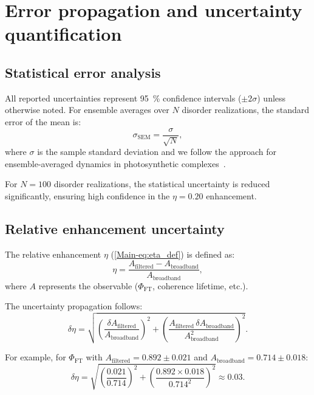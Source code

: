\documentclass[11pt,a4paper]{article}
\begin{document}
\section{Error propagation and uncertainty quantification}
\label{sec:S10}

\subsection{Statistical error analysis}

All reported uncertainties represent \SI{95}{\percent} confidence intervals ($\pm 2\sigma$) unless otherwise noted. For ensemble averages over $N$ disorder realizations, the standard error of the mean is:
\begin{equation}
\sigma_{\mathrm{SEM}} = \frac{\sigma}{\sqrt{N}},
\label{eq:SEM}
\end{equation}
where $\sigma$ is the sample standard deviation and we follow the approach for ensemble-averaged dynamics in photosynthetic complexes~\cite{Moix2011}.

For $N = 100$ disorder realizations, the statistical uncertainty is reduced significantly, ensuring high confidence in the $\eta = 0.20$ enhancement.

\subsection{Relative enhancement uncertainty}

The relative enhancement $\eta$ (\cref{Main-eq:eta_def}) is defined as:
\begin{equation}
\eta = \frac{A_{\mathrm{filtered}} - A_{\mathrm{broadband}}}{A_{\mathrm{broadband}}},
\label{eq:SI_eta_def}
\end{equation}
where $A$ represents the observable ($\Phi_{\mathrm{FT}}$, coherence lifetime, etc.).

The uncertainty propagation follows:
\begin{equation}
\delta\eta = \sqrt{\left(\frac{\delta A_{\mathrm{filtered}}}{A_{\mathrm{broadband}}}\right)^2 + \left(\frac{A_{\mathrm{filtered}} \, \delta A_{\mathrm{broadband}}}{A_{\mathrm{broadband}}^2}\right)^2}.
\label{eq:error_propagation}
\end{equation}

For example, for $\Phi_{\mathrm{FT}}$ with $A_{\mathrm{filtered}} = 0.892 \pm 0.021$ and $A_{\mathrm{broadband}} = 0.714 \pm 0.018$:
\begin{equation}
\delta\eta = \sqrt{\left(\frac{0.021}{0.714}\right)^2 + \left(\frac{0.892 \times 0.018}{0.714^2}\right)^2} \approx 0.03.
\end{equation}
\end{document}
